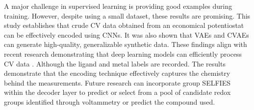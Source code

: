 A major challenge in supervised learning is providing good examples during training. However, despite using a small dataset, these results are promising. This study establishes that crude CV data obtained from an economical potentiostat can be effectively encoded using CNNs. It was also shown that VAEs and CVAEs can generate high-quality, generalizable synthetic data. These findings align with recent research demonstrating that deep learning models can efficiently process CV data \cite{Hoar2022}. Although the ligand and metal labels are recorded. The results demonstrate that the encoding technique effectively captures the chemistry behind the measurements. Future research can incorporate group SELFIES within the decoder layer to predict or select from a pool of candidate redox groups identified through voltammetry or predict the compound used. 
